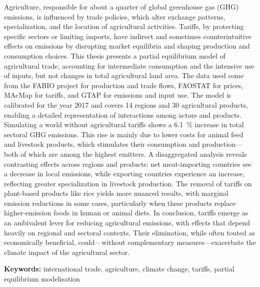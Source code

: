 
Agriculture, responsible for about a quarter of global greenhouse gas (GHG) emissions, is influenced by trade policies, which alter exchange patterns, specialization, and the location of agricultural activities. Tariffs, by protecting specific sectors or limiting imports, have indirect and sometimes counterintuitive effects on emissions by disrupting market equilibria and shaping production and consumption choices. This thesis presents a partial equilibrium model of agricultural trade, accounting for intermediate consumption and the intensive use of inputs, but not changes in total agricultural land area. The data used come from the FABIO project for production and trade flows, FAOSTAT for prices, MAcMap for tariffs, and GTAP for emissions and input use. The model is calibrated for the year 2017 and covers 14 regions and 30 agricultural products, enabling a detailed representation of interactions among actors and products.
Simulating a world without agricultural tariffs shows a 6.1~\% increase in total sectoral GHG emissions. This rise is mainly due to lower costs for animal feed and livestock products, which stimulates their consumption and production—both of which are among the highest emitters. A disaggregated analysis reveals contrasting effects across regions and products: net meat-importing countries see a decrease in local emissions, while exporting countries experience an increase, reflecting greater specialization in livestock production. The removal of tariffs on plant-based products like rice yields more nuanced results, with marginal emission reductions in some cases, particularly when these products replace higher-emission foods in human or animal diets.
In conclusion, tariffs emerge as an ambivalent lever for reducing agricultural emissions, with effects that depend heavily on regional and sectoral contexts. Their elimination, while often touted as economically beneficial, could—without complementary measures—exacerbate the climate impact of the agricultural sector.

\textbf{Keywords:} international trade, agriculture, climate change, tariffs, partial equilibrium modelisation